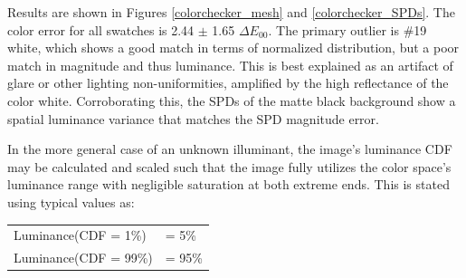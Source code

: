 \documentclass[twocolumn,10pt]{asme2ej}
\newcommand{\id}{\hspace{6 mm}}
\begin{document}
%
%
%

\id Results are shown in Figures \ref{colorchecker_mesh} and \ref{colorchecker_SPDs}. The color error for all swatches is 2.44 $\pm$ 1.65 $\Delta E_{00}$. The primary outlier is \#19 white, which shows a good match in terms of normalized distribution, but a poor match in magnitude and thus luminance. This is best explained as an artifact of glare or other lighting non-uniformities, amplified by the high reflectance of the color white. Corroborating this, the SPDs of the matte black background show a spatial luminance variance that matches the SPD magnitude error.

\id In the more general case of an unknown illuminant, the image's luminance CDF may be calculated and scaled such that the image fully utilizes the color space's luminance range with negligible saturation at both extreme ends. This is stated using typical values as:\\

\begin{tabular}{l l}
Luminance(CDF = 1\%) & = 5\%\\
Luminance(CDF = 99\%) & = 95\%\\
\end{tabular}\\

\end{document}
